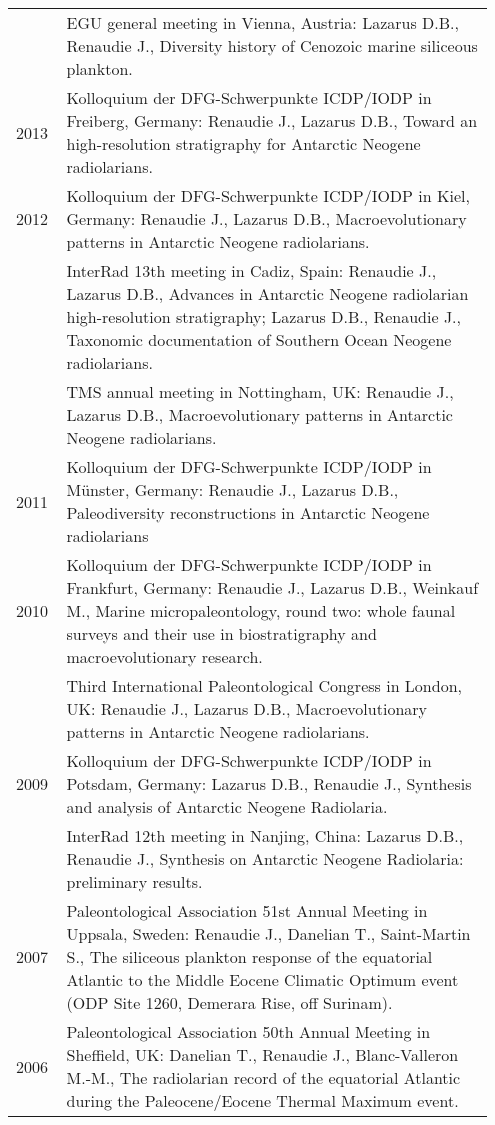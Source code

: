 \documentclass[11pt, a4paper]{article}
\begin{document}
\begin{longtable}{p{0.1\linewidth} P{0.85\linewidth}}
 & EGU general meeting in Vienna, Austria: Lazarus D.B., Renaudie J., Diversity history of Cenozoic marine siliceous plankton.\\
2013 & Kolloquium der DFG-Schwerpunkte ICDP/IODP in Freiberg, Germany: Renaudie J., Lazarus D.B., Toward an high-resolution stratigraphy for Antarctic Neogene radiolarians.\\
2012 & Kolloquium der DFG-Schwerpunkte ICDP/IODP in Kiel, Germany: Renaudie J., Lazarus D.B., Macroevolutionary patterns in Antarctic Neogene radiolarians.\\
 & InterRad 13th meeting in Cadiz, Spain: Renaudie J., Lazarus D.B., Advances in Antarctic Neogene radiolarian high-resolution stratigraphy; Lazarus D.B., Renaudie J., Taxonomic documentation of Southern Ocean Neogene radiolarians.\\
 & TMS annual meeting in Nottingham, UK: Renaudie J., Lazarus D.B., Macroevolutionary patterns in Antarctic Neogene radiolarians.\\
2011 & Kolloquium der DFG-Schwerpunkte ICDP/IODP in Münster, Germany: Renaudie J., Lazarus D.B., Paleodiversity reconstructions in Antarctic Neogene radiolarians\\
2010 & Kolloquium der DFG-Schwerpunkte ICDP/IODP in Frankfurt, Germany: Renaudie J., Lazarus D.B., Weinkauf M., Marine micropaleontology, round two: whole faunal surveys and their use in biostratigraphy and macroevolutionary research.\\
 & Third International Paleontological Congress in London, UK: Renaudie J., Lazarus D.B., Macroevolutionary patterns in Antarctic Neogene radiolarians.\\
2009 & Kolloquium der DFG-Schwerpunkte ICDP/IODP in Potsdam, Germany: Lazarus D.B., Renaudie J., Synthesis and analysis of Antarctic Neogene Radiolaria.\\
 & InterRad 12th meeting in Nanjing, China: Lazarus D.B., Renaudie J., Synthesis on Antarctic Neogene Radiolaria: preliminary results.\\
2007 & Paleontological Association 51st Annual Meeting in Uppsala, Sweden: Renaudie J., Danelian T., Saint-Martin S., The siliceous plankton response of the equatorial Atlantic to the Middle Eocene Climatic Optimum event (ODP Site 1260, Demerara Rise, off Surinam).\\
2006 & Paleontological Association 50th Annual Meeting in Sheffield, UK: Danelian T., Renaudie J., Blanc-Valleron M.-M., The radiolarian record of the equatorial Atlantic during the Paleocene/Eocene Thermal Maximum event.\\
\end{longtable}
\end{document}

